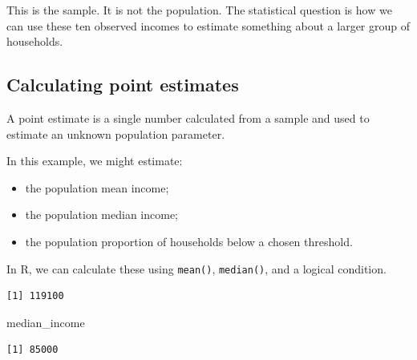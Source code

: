 \documentclass[
  letterpaper,
  DIV=11,
  numbers=noendperiod]{scrreprt}
\newenvironment{Shaded}{\begin{snugshade}}{\end{snugshade}}
\newcommand{\DecValTok}[1]{\textcolor[rgb]{0.68,0.00,0.00}{#1}}
\newcommand{\FunctionTok}[1]{\textcolor[rgb]{0.28,0.35,0.67}{#1}}
\newcommand{\NormalTok}[1]{\textcolor[rgb]{0.00,0.23,0.31}{#1}}
\newcommand{\OtherTok}[1]{\textcolor[rgb]{0.00,0.23,0.31}{#1}}
\newcommand{\SpecialCharTok}[1]{\textcolor[rgb]{0.37,0.37,0.37}{#1}}
\providecommand{\tightlist}{%
  \setlength{\itemsep}{0pt}\setlength{\parskip}{0pt}}
\begin{document}
This is the sample. It is not the population. The statistical question
is how we can use these ten observed incomes to estimate something about
a larger group of households.

\subsection{Calculating point
estimates}\label{calculating-point-estimates}

A point estimate is a single number calculated from a sample and used to
estimate an unknown population parameter.

In this example, we might estimate:

\begin{itemize}
\tightlist
\item
  the population mean income;
\item
  the population median income;
\item
  the population proportion of households below a chosen threshold.
\end{itemize}

In R, we can calculate these using \texttt{mean()}, \texttt{median()},
and a logical condition.

\begin{Shaded}
\end{Shaded}

\begin{verbatim}
[1] 119100
\end{verbatim}

\begin{Shaded}
\begin{Highlighting}[]
\NormalTok{median\_income}
\end{Highlighting}
\end{Shaded}

\begin{verbatim}
[1] 85000
\end{verbatim}
\end{document}
